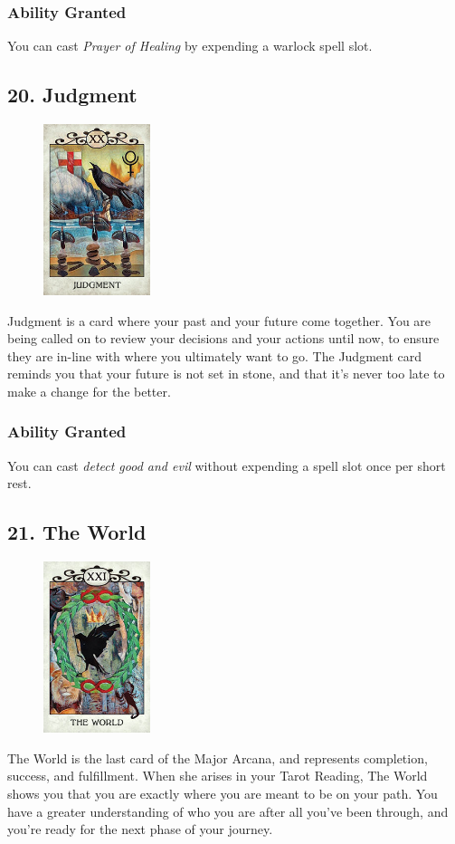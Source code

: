 \documentclass[10pt,twoside,twocolumn,openany,nodeprecatedcode]{dndbook}
\begin{document}
    \subsubsection*{Ability Granted}
    You can cast \emph{Prayer of Healing} by expending a warlock spell slot.

    \subsection*{20. Judgment}

    \begin{figure}
        \includegraphics[height=5cm,width=\linewidth]{judgment.jpg}
    \end{figure}
    Judgment is a card where your past and your future come together. You are being called on to review your decisions and your actions until now, to ensure they are in-line with where you ultimately want to go. The Judgment card reminds you that your future is not set in stone, and that it's never too late to make a change for the better. 

    \subsubsection*{Ability Granted}
    You can cast \emph{detect good and evil} without expending a spell slot once per short rest.

    \subsection*{21. The World}

    \begin{figure}
        \includegraphics[height=5cm,width=\linewidth]{world.jpg}
    \end{figure}
    The World is the last card of the Major Arcana, and represents completion, success, and fulfillment. When she arises in your Tarot Reading, The World shows you that you are exactly where you are meant to be on your path. You have a greater understanding of who you are after all you've been through, and you're ready for the next phase of your journey.
\end{document}
